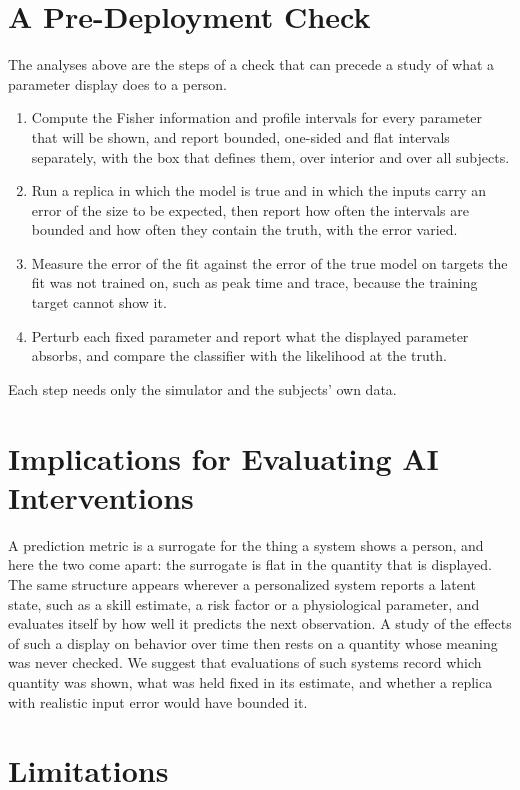 \documentclass[letterpaper]{article} %
\begin{document}
\section{A Pre-Deployment Check}

The analyses above are the steps of a check that can precede a study of what a parameter display does to a person.
\begin{enumerate}
\item Compute the Fisher information and profile intervals for every parameter that will be shown, and report bounded, one-sided and flat intervals separately, with the box that defines them, over interior and over all subjects.
\item Run a replica in which the model is true and in which the inputs carry an error of the size to be expected, then report how often the intervals are bounded and how often they contain the truth, with the error varied.
\item Measure the error of the fit against the error of the true model on targets the fit was not trained on, such as peak time and trace, because the training target cannot show it.
\item Perturb each fixed parameter and report what the displayed parameter absorbs, and compare the classifier with the likelihood at the truth.
\end{enumerate}
Each step needs only the simulator and the subjects' own data.

\section{Implications for Evaluating AI Interventions}

A prediction metric is a surrogate for the thing a system shows a person, and here the two come apart: the surrogate is flat in the quantity that is displayed. The same structure appears wherever a personalized system reports a latent state, such as a skill estimate, a risk factor or a physiological parameter, and evaluates itself by how well it predicts the next observation. A study of the effects of such a display on behavior over time then rests on a quantity whose meaning was never checked. We suggest that evaluations of such systems record which quantity was shown, what was held fixed in its estimate, and whether a replica with realistic input error would have bounded it.

\section{Limitations}
\end{document}
